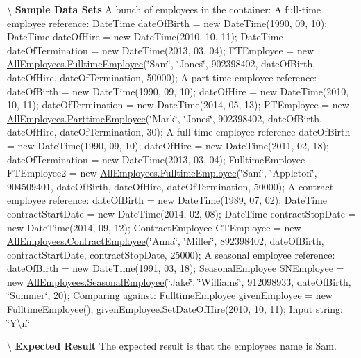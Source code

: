 \textbackslash{} {\bfseries  Sample Data Sets} A bunch of employees in the container\+: A full-\/time employee reference\+: Date\+Time date\+Of\+Birth = new Date\+Time(1990, 09, 10); Date\+Time date\+Of\+Hire = new Date\+Time(2010, 10, 11); Date\+Time date\+Of\+Termination = new Date\+Time(2013, 03, 04); F\+T\+Employee = new \hyperlink{class_all_employees_1_1_fulltime_employee}{All\+Employees.\+Fulltime\+Employee}(\char`\"{}\+Sam\char`\"{}, \char`\"{}\+Jones\char`\"{}, 902398402, date\+Of\+Birth, date\+Of\+Hire, date\+Of\+Termination, 50000); A part-\/time employee reference\+: date\+Of\+Birth = new Date\+Time(1990, 09, 10); date\+Of\+Hire = new Date\+Time(2010, 10, 11); date\+Of\+Termination = new Date\+Time(2014, 05, 13); P\+T\+Employee = new \hyperlink{class_all_employees_1_1_parttime_employee}{All\+Employees.\+Parttime\+Employee}(\char`\"{}\+Mark\char`\"{}, \char`\"{}\+Jones\char`\"{}, 902398402, date\+Of\+Birth, date\+Of\+Hire, date\+Of\+Termination, 30); A full-\/time employee reference date\+Of\+Birth = new Date\+Time(1990, 09, 10); date\+Of\+Hire = new Date\+Time(2011, 02, 18); date\+Of\+Termination = new Date\+Time(2013, 03, 04); Fulltime\+Employee F\+T\+Employee2 = new \hyperlink{class_all_employees_1_1_fulltime_employee}{All\+Employees.\+Fulltime\+Employee}(\char`\"{}\+Sam\char`\"{}, \char`\"{}\+Appleton\char`\"{}, 904509401, date\+Of\+Birth, date\+Of\+Hire, date\+Of\+Termination, 50000); A contract employee reference\+: date\+Of\+Birth = new Date\+Time(1989, 07, 02); Date\+Time contract\+Start\+Date = new Date\+Time(2014, 02, 08); Date\+Time contract\+Stop\+Date = new Date\+Time(2014, 09, 12); Contract\+Employee C\+T\+Employee = new \hyperlink{class_all_employees_1_1_contract_employee}{All\+Employees.\+Contract\+Employee}(\char`\"{}\+Anna\char`\"{}, \char`\"{}\+Miller\char`\"{}, 892398402, date\+Of\+Birth, contract\+Start\+Date, contract\+Stop\+Date, 25000); A seasonal employee reference\+: date\+Of\+Birth = new Date\+Time(1991, 03, 18); Seasonal\+Employee S\+N\+Employee = new \hyperlink{class_all_employees_1_1_seasonal_employee}{All\+Employees.\+Seasonal\+Employee}(\char`\"{}\+Jake\char`\"{}, \char`\"{}\+Williams\char`\"{}, 912098933, date\+Of\+Birth, \char`\"{}\+Summer\char`\"{}, 20); Comparing against\+: Fulltime\+Employee given\+Employee = new Fulltime\+Employee(); given\+Employee.\+Set\+Date\+Of\+Hire(2010, 10, 11); Input string\+: \char`\"{}\+Y\textbackslash{}n\char`\"{}

\textbackslash{} {\bfseries  Expected Result} The expected result is that the employee\textquotesingle{}s name is Sam.

